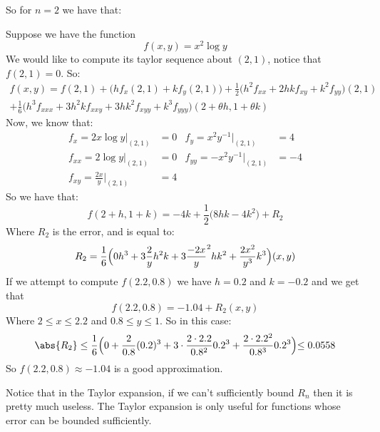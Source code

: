 \documentclass[10pt]{article}
\begin{document}
\medskip
{}

\smallskip
So for $n=2$ we have that:

\newpage
{}

\begin{exam}

    Suppose we have the function
    \[ f(x,y) = x^2\log y \]
    We would like to compute its taylor sequence about $(2,1)$, notice that $f(2,1)=0$.
    So:
    \begin{multline*}
    f(x,y) = f(2,1) + \bigl(hf_x(2,1)+kf_y(2,1)\bigl) + \frac12\bigl(h^2f_{xx}+2hkf_{xy}+k^2f_{yy}\bigl)(2,1)\\+ \frac16\bigl(h^3f_{xxx}+3h^2kf_{xxy}+3hk^2f_{xyy}+k^3f_{yyy}\bigl)(2+\theta h,1+\theta k)
    \end{multline*}
    Now, we know that:
    \begin{align*}
        f_x = 2x\log y\Big|_{(2,1)} &= 0        & f_y=x^2y^{-1}\Big|_{(2,1)}&=4 \\
        f_{xx} = 2\log y\Big|_{(2,1)}&= 0       & f_{yy}=-x^2y^{-1}\Big|_{(2,1)}&=-4 \\
        f_{xy} = \frac{2x}y\Big|_{(2,1)}&=4
    \end{align*}
    So we have that:
    \[ f(2+h,1+k) = -4k + \frac12\bigl(8hk-4k^2\bigl) + R_2 \]
    Where $R_2$ is the error, and is equal to:
    \[ R_2 = \frac16\Bigl(0h^3+3\frac2yh^2k+3\frac{-2x}y^2hk^2+\frac{2x^2}{y^3}k^3\Bigl)(x,y) \]
    If we attempt to compute $f(2.2,0.8)$ we have $h=0.2$ and $k=-0.2$ and we get that
    \[ f(2.2,0.8) = -1.04 + R_2(x,y) \]
    Where $2\leq x\leq2.2$ and $0.8\leq y\leq1$.
    So in this case:
    \[ \abs{R_2} \leq \frac16\Bigl(0+\frac2{0.8}(0.2)^3+3\cdot\frac{2\cdot2.2}{0.8^2}0.2^3+\frac{2\cdot2.2^2}{0.8^3}0.2^3\Bigl)\leq0.0558 \]
    So $f(2.2,0.8)\approx-1.04$ is a good approximation.

\end{exam}

Notice that in the Taylor expansion, if we can't sufficiently bound $R_n$ then it is pretty much useless.
The Taylor expansion is only useful for functions whose error can be bounded sufficiently.
\end{document}

